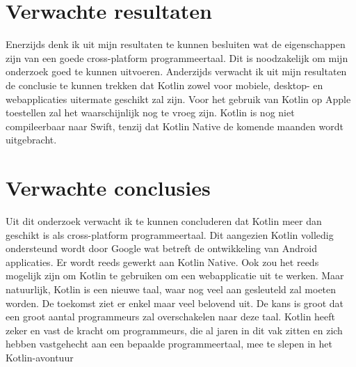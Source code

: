 \section{Verwachte resultaten}
\label{sec:verwachte_resultaten}
Enerzijds denk ik uit mijn resultaten te kunnen besluiten wat de eigenschappen zijn van een goede cross-platform programmeertaal. Dit is noodzakelijk om mijn onderzoek goed te kunnen uitvoeren.
\newline
\newline
Anderzijds verwacht ik uit mijn resultaten de conclusie te kunnen trekken dat Kotlin zowel voor mobiele, desktop- en webapplicaties uitermate geschikt zal zijn. Voor het gebruik van Kotlin op Apple toestellen zal het waarschijnlijk nog te vroeg zijn. Kotlin is nog niet compileerbaar naar Swift, tenzij dat Kotlin Native de komende maanden wordt uitgebracht.

\section{Verwachte conclusies}
\label{sec:verwachte_conclusies}
Uit dit onderzoek verwacht ik te kunnen concluderen dat Kotlin meer dan geschikt is als cross-platform programmeertaal. Dit aangezien Kotlin volledig ondersteund wordt door Google wat betreft de ontwikkeling van Android applicaties. Er wordt reeds gewerkt aan Kotlin Native. Ook zou het reeds mogelijk zijn om Kotlin te gebruiken om een webapplicatie uit te werken. Maar natuurlijk, Kotlin is een nieuwe taal, waar nog veel aan gesleuteld zal moeten worden. De toekomst ziet er enkel maar veel belovend uit. De kans is groot dat een groot aantal programmeurs zal overschakelen naar deze taal. Kotlin heeft zeker en vast de kracht om programmeurs, die al jaren in dit vak zitten en zich hebben vastgehecht aan een bepaalde programmeertaal, mee te slepen in het Kotlin-avontuur


\printbibliography[heading=bibintoc]
\nocite{SSDK}
\nocite{Kotlin}




